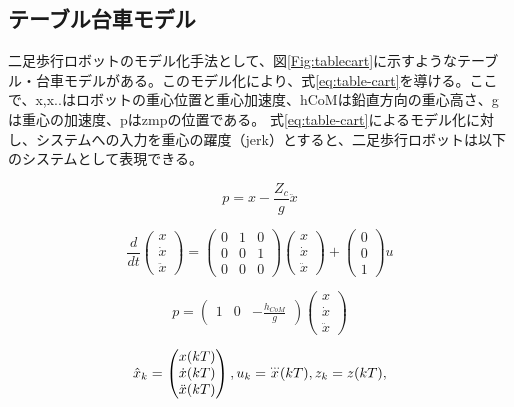 \subsection{テーブル台車モデル}
二足歩行ロボットのモデル化手法として、図\ref{Fig:tablecart}に示すようなテーブル・台車モデルがある。このモデル化により、式\eqref{eq:table-cart}を導ける。ここで、x,x..はロボットの重心位置と重心加速度、hCoMは鉛直方向の重心高さ、gは重心の加速度、pはzmpの位置である。
式\eqref{eq:table-cart}によるモデル化に対し、システムへの入力を重心の躍度（jerk）とすると、二足歩行ロボットは以下のシステムとして表現できる。

\begin{equation}
  p = x - \frac{Z_{c}}{g}\ddot{x}
  \label{eq:table-cart}
\end{equation}


\begin{equation}
  \frac{d}{dt}\begin{pmatrix}
    x \\ \dot{x} \\ \ddot{x}
  \end{pmatrix}
  =
  \begin{pmatrix}
    0 & 1 & 0 \\ 0 & 0 & 1 \\ 0 & 0 & 0
  \end{pmatrix}
  \begin{pmatrix}
    x \\ \dot{x} \\ \ddot{x}
  \end{pmatrix}
  +
  \begin{pmatrix}
    0 \\ 0 \\ 1
  \end{pmatrix}
  u
  \label{eq:teble-cart-system-state}
\end{equation}

\begin{equation}
  p = \begin{pmatrix}
    1 & 0 & -\frac{h_{CoM}}{g}
  \end{pmatrix}
  \begin{pmatrix}
    x \\ \dot{x} \\ \ddot{x}
  \end{pmatrix}
  \label{eq:teble-cart-system-output}
\end{equation}



\begin{equation}
  \hat{x}_{k}=
  \begin{pmatrix}
    x(kT)\cr \dot{x}(kT)\cr\ddot{x}(kT)
  \end{pmatrix}
  ,
  u_{k}
    =
    {\buildrel\ldots\over{x}}(kT)
    , z_{k}=z(kT),
\end{equation}

